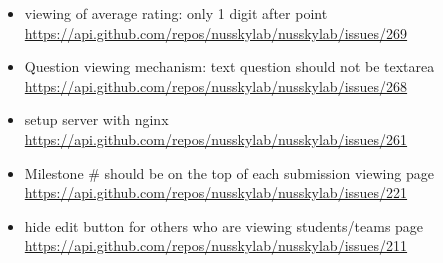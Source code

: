 {\begin{itemize}[noitemsep]
    \item viewing of average rating: only 1 digit after point \url{https://api.github.com/repos/nusskylab/nusskylab/issues/269} 
    \item Question viewing mechanism: text question should not be textarea \url{https://api.github.com/repos/nusskylab/nusskylab/issues/268} 
    \item setup server with nginx \url{https://api.github.com/repos/nusskylab/nusskylab/issues/261} 
    \item Milestone \# should be on the top of each submission viewing page \url{https://api.github.com/repos/nusskylab/nusskylab/issues/221} 
    \item hide edit button for others who are viewing students/teams page \url{https://api.github.com/repos/nusskylab/nusskylab/issues/211} 
\end{itemize}

}
